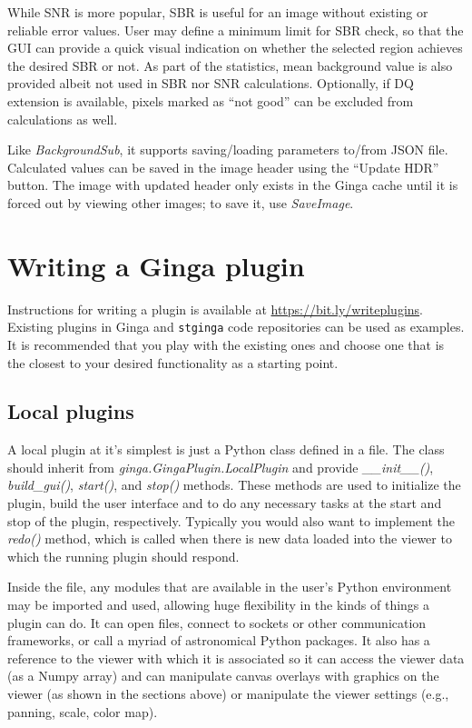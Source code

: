 \documentclass[11pt,twoside]{article}
\begin{document}

While SNR is more popular, SBR is useful for an image without existing or
reliable error values. User may define a minimum limit for SBR check,
so that the GUI can provide a quick visual indication on whether the
selected region achieves the desired SBR or not.
As part of the statistics, mean background value is also
provided albeit not used in SBR nor SNR calculations.
Optionally, if DQ extension is available, pixels marked as
``not good'' can be excluded from calculations as well.

Like {\em BackgroundSub}, it supports saving/loading parameters to/from
JSON file.
Calculated values can be saved in the image header using the ``Update HDR''
button.
The image with updated header only exists in the Ginga cache until it
is forced out by viewing other images; to save it, use {\em SaveImage}.

\section{Writing a Ginga plugin}

Instructions for writing a plugin is available at
\url{https://bit.ly/writeplugins}.
Existing plugins in Ginga and {\tt stginga} code repositories can be used as
examples. It is recommended that you play with the existing ones and
choose one that is the closest to your desired functionality as a
starting point.

\subsection{Local plugins}

A local plugin at it's simplest is just a Python class defined in a file.
The class should inherit from {\em ginga.GingaPlugin.LocalPlugin}
and provide {\em \_\_init\_\_()}, {\em build\_gui()},
{\em start()}, and {\em stop()} methods.
These methods are used to initialize the
plugin, build the user interface and to do any necessary tasks at the
start and stop of the plugin, respectively. Typically you would also
want to implement the {\em redo()} method, which is called when there is
new data loaded into the viewer to which the running plugin should respond.

Inside the file, any modules that are available in the user's Python
environment may be imported and used, allowing huge flexibility in
the kinds of things a plugin can do.  It can open files, connect to
sockets or other communication frameworks, or call a myriad of
astronomical Python packages.  It also has a reference to the viewer with
which it is associated so it can access the viewer data (as a Numpy array)
and can manipulate canvas overlays with graphics on the viewer (as shown
in the sections above) or manipulate the viewer settings (e.g., panning,
scale, color map).
\end{document}
